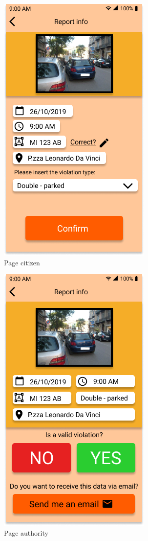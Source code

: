 \documentclass{article}
\begin{document}
\begin{figure}[h!]
    \centering
    \includegraphics[scale=0.5]{img/mockups/page_citizen.png}
    \caption{Page citizen}
\end{figure}

\begin{figure}[h!]
    \centering
    \includegraphics[scale=0.5]{img/mockups/page_authority.png}
    \caption{Page authority}
\end{figure}
\end{document}
